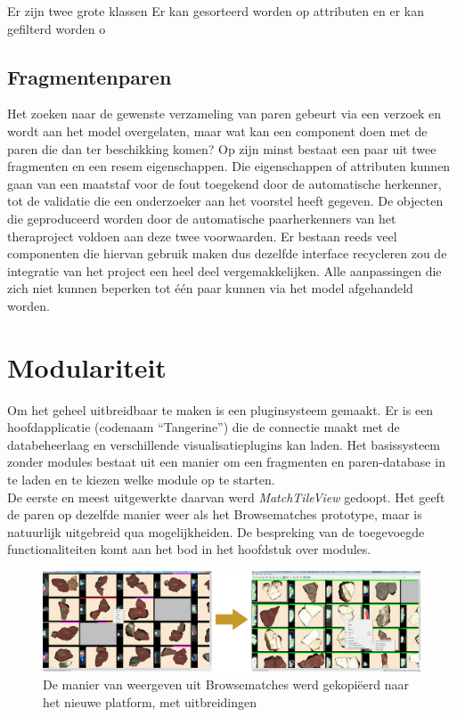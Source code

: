 Er zijn twee grote klassen
Er kan gesorteerd worden op attributen en er kan gefilterd worden o

\subsection{Fragmentenparen}
Het zoeken naar de gewenste verzameling van paren gebeurt via een verzoek en wordt aan het model overgelaten, maar wat kan een component doen met de paren die dan ter beschikking komen? Op zijn minst bestaat een paar uit twee fragmenten en een resem eigenschappen. Die eigenschappen of attributen kunnen gaan van een maatstaf voor de fout toegekend door de automatische herkenner, tot de validatie die een onderzoeker aan het voorstel heeft gegeven. De objecten die geproduceerd worden door de automatische paarherkenners van het theraproject voldoen aan deze twee voorwaarden. Er bestaan reeds veel componenten die hiervan gebruik maken dus dezelfde interface recycleren zou de integratie van het project een heel deel vergemakkelijken. Alle aanpassingen die zich niet kunnen beperken tot \'e\'en paar kunnen via het model afgehandeld worden.\\

\section{Modulariteit}
Om het geheel uitbreidbaar te maken is een pluginsysteem gemaakt. Er is een hoofdapplicatie (codenaam ``Tangerine'') die de connectie maakt met de databeheerlaag en verschillende visualisatieplugins kan laden. Het basissysteem zonder modules bestaat uit een manier om een fragmenten en paren-database in te laden en te kiezen welke module op te starten.\\

De eerste en meest uitgewerkte daarvan werd \emph{MatchTileView} gedoopt. Het geeft de paren op dezelfde manier weer als het Browsematches prototype, maar is natuurlijk uitgebreid qua mogelijkheiden. De bespreking van de toegevoegde functionaliteiten komt aan het bod in het hoofdstuk over modules.\\

\begin{figure}[ht]
	\begin{center}
		\includegraphics[width=1.0\columnwidth]{images/browsematches-to-tangerine-01.png}
		\caption{De manier van weergeven uit Browsematches werd gekopi\"eerd naar het nieuwe platform, met uitbreidingen}
		\label{fig:browsematchestotang}
	\end{center}
\end{figure}

